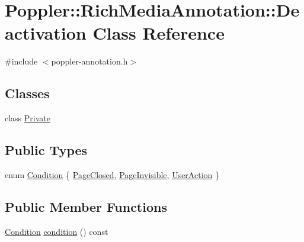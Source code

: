 \hypertarget{class_poppler_1_1_rich_media_annotation_1_1_deactivation}{}\section{Poppler\+:\+:Rich\+Media\+Annotation\+:\+:Deactivation Class Reference}
\label{class_poppler_1_1_rich_media_annotation_1_1_deactivation}


{\ttfamily \#include $<$poppler-\/annotation.\+h$>$}

\subsection*{Classes}
\begin{DoxyCompactItemize}
\item 
class \hyperlink{class_poppler_1_1_rich_media_annotation_1_1_deactivation_1_1_private}{Private}
\end{DoxyCompactItemize}
\subsection*{Public Types}
\begin{DoxyCompactItemize}
\item 
enum \hyperlink{class_poppler_1_1_rich_media_annotation_1_1_deactivation_a54ffabfb7c1f3ad2ea052ba6689468d3}{Condition} \{ \hyperlink{class_poppler_1_1_rich_media_annotation_1_1_deactivation_a54ffabfb7c1f3ad2ea052ba6689468d3a1eaa3a23752297dcc34df72ae5d0a54f}{Page\+Closed}, 
\hyperlink{class_poppler_1_1_rich_media_annotation_1_1_deactivation_a54ffabfb7c1f3ad2ea052ba6689468d3a8031a047369e73d706cf06b1d101703f}{Page\+Invisible}, 
\hyperlink{class_poppler_1_1_rich_media_annotation_1_1_deactivation_a54ffabfb7c1f3ad2ea052ba6689468d3a3cecd04e1b3de1873ae045959d549994}{User\+Action}
 \}
\end{DoxyCompactItemize}
\subsection*{Public Member Functions}
\begin{DoxyCompactItemize}
\item 
\hyperlink{class_poppler_1_1_rich_media_annotation_1_1_deactivation_a54ffabfb7c1f3ad2ea052ba6689468d3}{Condition} \hyperlink{class_poppler_1_1_rich_media_annotation_1_1_deactivation_afd8f14b9dc45f7392b9a41ed4e2f768b}{condition} () const
\end{DoxyCompactItemize}
